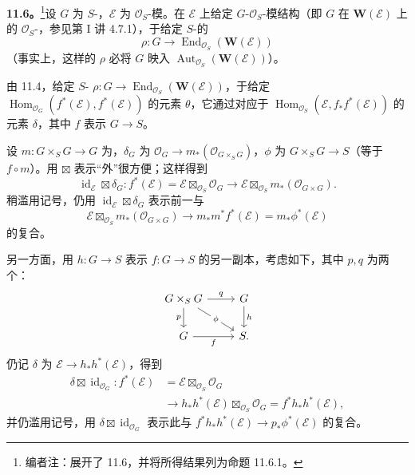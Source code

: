 \textbf{11.6。}\footnote{编者注：展开了 11.6，并将所得结果列为命题 11.6.1。}设 $G$ 为 $S$-，$\mathcal E$ 为 $\mathcal O_S$-模。在 $\mathcal E$ 上给定 $G$-$\mathcal O_S$-模结构（即 $G$ 在 $\mathbf W(\mathcal E)$ 上的 $\mathcal O_S$-，参见第 I 讲 4.7.1），于给定 $S$-的
\[
\rho:G\longrightarrow\operatorname{End}_{\mathcal O_S}(\mathbf W(\mathcal E))
\]
（事实上，这样的 $\rho$ 必将 $G$ 映入 $\operatorname{Aut}_{\mathcal O_S}(\mathbf W(\mathcal E))$）。

由 11.4，给定 $S$- $\rho:G\to\operatorname{End}_{\mathcal O_S}(\mathbf W(\mathcal E))$，于给定 $\operatorname{Hom}_{\mathcal O_G}(f^*(\mathcal E),f^*(\mathcal E))$ 的元素 $\theta$，它通过对应于 $\operatorname{Hom}_{\mathcal O_S}(\mathcal E,f_*f^*(\mathcal E))$ 的元素 $\delta$，其中 $f$ 表示 $G\to S$。

设 $m:G\times_S G\to G$ 为，$\delta_G$ 为 $\mathcal O_G\to m_*(\mathcal O_{G\times_S G})$，$\phi$ 为 $G\times_S G\to S$（等于 $f\circ m$）。用 $\boxtimes$ 表示“外”很方便；这样得到
\[
\operatorname{id}_{\mathcal E}\boxtimes\delta_G:
 f^*(\mathcal E)=\mathcal E\boxtimes_{\mathcal O_S}\mathcal O_G
\longrightarrow\mathcal E\boxtimes_{\mathcal O_S}m_*(\mathcal O_{G\times G}).
\]
稍滥用记号，仍用 $\operatorname{id}_{\mathcal E}\boxtimes\delta_G$ 表示前一与
\[
\mathcal E\boxtimes_{\mathcal O_S}m_*(\mathcal O_{G\times G})
\longrightarrow m_*m^*f^*(\mathcal E)=m_*\phi^*(\mathcal E)
\]
的复合。

另一方面，用 $h:G\to S$ 表示 $f:G\to S$ 的另一副本，考虑如下，其中 $p,q$ 为两个：
\[
\begin{tikzcd}
G\times_S G\arrow[r,"q"]\arrow[d,"p"']\arrow[dr,"\phi" description]&G\arrow[d,"h"]\\
G\arrow[r,"f"']&S.
\end{tikzcd}
\]
仍记 $\delta$ 为 $\mathcal E\to h_*h^*(\mathcal E)$，得到
\[
\begin{aligned}
\delta\boxtimes\operatorname{id}_{\mathcal O_G}:
 f^*(\mathcal E)&=\mathcal E\boxtimes_{\mathcal O_S}\mathcal O_G\\
&\longrightarrow h_*h^*(\mathcal E)\boxtimes_{\mathcal O_S}\mathcal O_G
=f^*h_*h^*(\mathcal E),
\end{aligned}
\]
并仍滥用记号，用 $\delta\boxtimes\operatorname{id}_{\mathcal O_G}$ 表示此与 $f^*h_*h^*(\mathcal E)\to p_*\phi^*(\mathcal E)$ 的复合。


